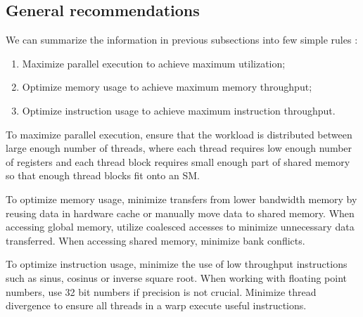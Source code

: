 \subsection{General recommendations}

We can summarize the information in previous subsections into few simple rules \citep{site:cuda}:

\begin{enumerate}
	\item Maximize parallel execution to achieve maximum utilization;
	\item Optimize memory usage to achieve maximum memory throughput;
	\item Optimize instruction usage to achieve maximum instruction throughput.
\end{enumerate}

To maximize parallel execution, ensure that the workload is distributed between large enough number of threads, where each thread requires low enough number of registers and each thread block requires small enough part of shared memory so that enough thread blocks fit onto an SM.

To optimize memory usage, minimize transfers from lower bandwidth memory by reusing data in hardware cache or manually move data to shared memory. When accessing global memory, utilize coalesced accesses to minimize unnecessary data transferred. When accessing shared memory, minimize bank conflicts.

To optimize instruction usage, minimize the use of low throughput instructions such as sinus, cosinus or inverse square root. When working with floating point numbers, use 32 bit numbers if precision is not crucial. Minimize thread divergence to ensure all threads in a warp execute useful instructions.








